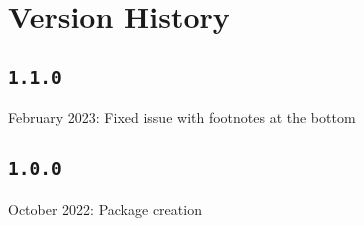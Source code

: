 \documentclass[12pt]{article}
\begin{document}
\section{Version History}
\subsection*{\texttt{1.1.0}}

 February 2023: Fixed issue with footnotes at the bottom

\subsection*{\texttt{1.0.0}}

 October 2022: Package creation

	
\end{document}
